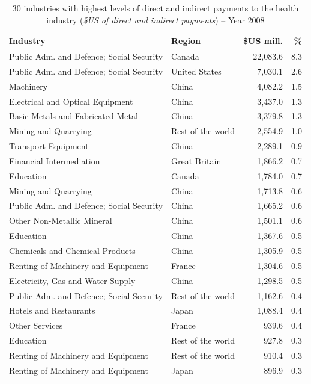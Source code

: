\documentclass[a4paper,12pt, ]{article}
\begin{document}
\begin{table} %
\caption{30 industries with highest levels of direct and indirect payments to the health industry (\textit{\$US of direct and indirect payments}) -- Year 2008} 
\begin{center}
\small \begin{tabular}{llrr}
 \textbf{Industry} & \textbf{Region} & \textbf{\$US mill.}&\textbf{\%}\\ 
 \hline
Public Adm. and Defence; Social Security & Canada &  22,083.6  & 8.3\\ 
Public Adm. and Defence; Social Security & United States &  7,030.1  & 2.6\\ 
Machinery & China &  4,082.2  & 1.5\\ 
Electrical and Optical Equipment & China &  3,437.0  & 1.3\\ 
Basic Metals and Fabricated Metal & China &  3,379.8  & 1.3\\ 
Mining and Quarrying & Rest of the world &  2,554.9  & 1.0\\ 
Transport Equipment & China &  2,289.1  & 0.9\\ 
Financial Intermediation & Great Britain &  1,866.2  & 0.7\\ 
Education & Canada &  1,784.0  & 0.7\\ 
Mining and Quarrying & China &  1,713.8  & 0.6\\ 
Public Adm. and Defence; Social Security & China &  1,665.2  & 0.6\\ 
Other Non-Metallic Mineral & China &  1,501.1  & 0.6\\ 
Education & China &  1,367.6  & 0.5\\ 
Chemicals and Chemical Products & China &  1,305.9  & 0.5\\ 
Renting of Machinery and Equipment & France &  1,304.6  & 0.5\\ 
Electricity, Gas and Water Supply & China &  1,298.5  & 0.5\\ 
Public Adm. and Defence; Social Security & Rest of the world &  1,162.6  & 0.4\\ 
Hotels and Restaurants & Japan &  1,088.4  & 0.4\\ 
Other Services & France &  939.6  & 0.4\\ 
Education & Rest of the world &  927.8  & 0.3\\ 
Renting of Machinery and Equipment & Rest of the world &  910.4  & 0.3\\ 
Renting of Machinery and Equipment & Japan &  896.9  & 0.3\\ 

\end{tabular}
\end{center}
\end{table}
\end{document}
